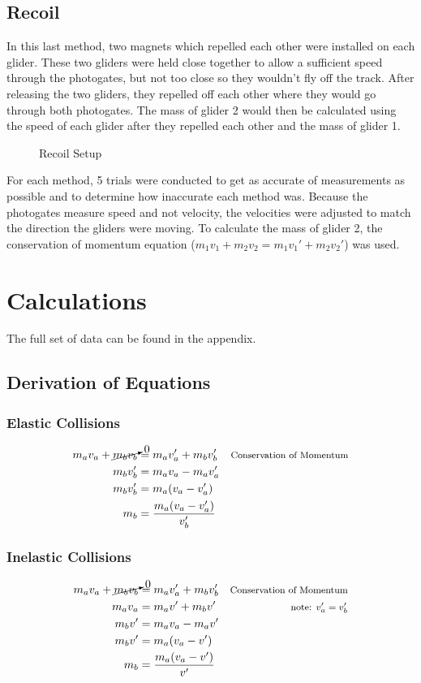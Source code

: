 \documentclass[12pt]{article}
\begin{document}
\subsection{Recoil}
In this last method, two magnets which repelled each other were installed on each glider. These two gliders were held close together to allow a sufficient speed through the photogates, but not too close so they wouldn't fly off the track. After releasing the two gliders, they repelled off each other where they would go through both photogates. The mass of glider 2 would then be calculated using the speed of each glider after they repelled each other and the mass of glider 1.
\begin{figure}[H]   %
    \centering
    \caption{Recoil Setup}
\end{figure}
For each method, 5 trials were conducted to get as accurate of measurements as possible and to determine how inaccurate each method was. Because the photogates measure speed and not velocity, the velocities were adjusted to match the direction the gliders were moving. To calculate the mass of glider 2, the conservation of momentum equation ($m_1v_1+m_2v_2=m_1v_1'+m_2v_2'$) was used.

\newpage
\section{Calculations}
The full set of data can be found in the appendix.
\subsection{Derivation of Equations}
\subsubsection{Elastic Collisions}
\begin{equation}
    \begin{aligned} m_av_a+\cancelto{0}{m_bv_b}&=m_av_a'+m_bv_b' & \text{\footnotesize{Conservation of Momentum}}\\
        m_bv_b'&=m_av_a-m_av_a' \\
        m_bv_b'&=m_a(v_a-v_a') \\
        m_b&=\frac{m_a(v_a-v_a')}{v_b'}
    \end{aligned}
\end{equation}
\subsubsection{Inelastic Collisions}
\begin{equation}
    \begin{aligned}
        m_av_a+\cancelto{0}{m_bv_b}&=m_av_a'+m_bv_b' & \text{\footnotesize{Conservation of Momentum}} \\
        m_av_a&=m_av'+m_bv' & \text{\footnotesize note: $v_a'=v_b'$} \\
        m_bv'&=m_av_a-m_av' \\
        m_bv'&=m_a(v_a-v') \\
        m_b&=\frac{m_a(v_a-v')}{v'}
    \end{aligned}
\end{equation}
\end{document}
